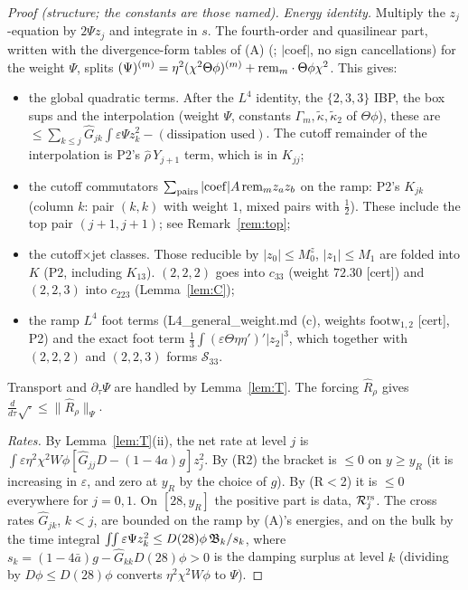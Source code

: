 \documentclass[11pt]{article}
\theoremstyle{remark}\newtheorem{remark}[theorem]{Remark}
\newcommand{\fn}[1]{\texttt{\detokenize{#1}}}
\newcommand{\tC}{\textup{[cert]}}\newcommand{\tE}{\textup{[est]}}\newcommand{\tP}{\textup{[paper]}}\newcommand{\tR}{\textup{[rev]}}
\begin{document}
\begin{proof}[Proof (structure; the constants are those named)]
\emph{Energy identity.} Multiply the $z_j$-equation by $2\Psi z_j$ and integrate in $s$. The fourth-order and quasilinear part, written with the divergence-form tables of (A) (\fn{tables_exact.pkl}; $|$coef$|$, no sign cancellations) for the weight $\Psi$, splits $(\Psi)^{(m)}=\eta^2(\chi^2\Theta\phi)^{(m)}+{\rm rem}_m\cdot\Theta\phi\chi^2$. This gives:
\begin{itemize}[itemsep=0pt]
\item the global quadratic terms. After the $L^4$ identity, the $\{2,3,3\}$ IBP, the box sups and the interpolation (weight $\Psi$, constants $\Gamma_m,\tilde\kappa,\tilde\kappa_2$ of $\Theta\phi$), these are $\le\sum_{k\le j}\hat G_{jk}\int\varepsilon\Psi z_k^2-(\text{dissipation used})$. The cutoff remainder of the interpolation is P2's $\hat\rho\,Y_{j+1}$ term, which is in $K_{jj}$;
\item the cutoff commutators $\sum_{\rm pairs}|{\rm coef}|A\,{\rm rem}_mz_az_b$ on the ramp: P2's $K_{jk}$ (column $k$: pair $(k,k)$ with weight $1$, mixed pairs with $\frac12$). These include the top pair $(j+1,j+1)$; see Remark~\ref{rem:top};
\item the cutoff$\times$jet classes. Those reducible by $|z_0|\le M_0^z$, $|z_1|\le M_1$ are folded into $K$ (P2, including $K_{13}$). $(2,2,2)$ goes into $c_{33}$ (weight $72.30$ \tC) and $(2,2,3)$ into $c_{223}$ (Lemma~\ref{lem:C});
\item the ramp $L^4$ foot terms (L4\_general\_weight.md (c), weights $\mathrm{footw}_{1,2}$ \tC, P2) and the exact foot term $\frac13\int(\varepsilon\Theta\eta\eta')'|z_2|^3$, which together with $(2,2,2)$ and $(2,2,3)$ forms $\mathcal S_{33}$.
\end{itemize}
Transport and $\partial_\tau\Psi$ are handled by Lemma~\ref{lem:T}. The forcing $\hat R_\rho$ gives $\frac d{d\tau}\sqrt{\cdot}\le\|\hat R_\rho\|_\Psi$.

\emph{Rates.} By Lemma~\ref{lem:T}(ii), the net rate at level $j$ is $\int\varepsilon\eta^2\chi^2W\phi[\hat G_{jj}D-(1-4a)g]z_j^2$. By (R2) the bracket is $\le0$ on $y\ge y_R$ (it is increasing in $\varepsilon$, and zero at $y_R$ by the choice of $g$). By (R$<$2) it is $\le0$ everywhere for $j=0,1$. On $[28,y_R]$ the positive part is data, $\mathcal R^{\rm rs}_j$. The cross rates $\hat G_{jk}$, $k<j$, are bounded on the ramp by (A)'s energies, and on the bulk by the time integral $\int\!\!\int\varepsilon\Psi z_k^2\le D(28)\phi\,\mathfrak B_k/s_k$, where $s_k=(1-4\bar a)g-\hat G_{kk}D(28)\phi>0$ is the damping surplus at level $k$ (dividing by $D\phi\le D(28)\phi$ converts $\eta^2\chi^2W\phi$ to $\Psi$).


\end{proof}
\end{document}
